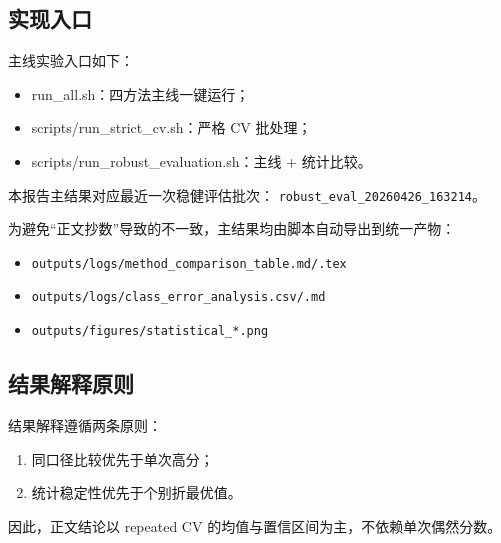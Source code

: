 \subsection{实现入口}

主线实验入口如下：

\begin{itemize}
    \item run\_all.sh：四方法主线一键运行；
    \item scripts/run\_strict\_cv.sh：严格 CV 批处理；
    \item scripts/run\_robust\_evaluation.sh：主线 + 统计比较。
\end{itemize}

本报告主结果对应最近一次稳健评估批次：
\texttt{robust\_eval\_20260426\_163214}。

为避免“正文抄数”导致的不一致，主结果均由脚本自动导出到统一产物：
\begin{itemize}
    \item \texttt{outputs/logs/method\_comparison\_table.md/.tex}
    \item \texttt{outputs/logs/class\_error\_analysis.csv/.md}
    \item \texttt{outputs/figures/statistical\_*.png}
\end{itemize}

\subsection{结果解释原则}

结果解释遵循两条原则：

\begin{enumerate}
    \item 同口径比较优先于单次高分；
    \item 统计稳定性优先于个别折最优值。
\end{enumerate}

因此，正文结论以 repeated CV 的均值与置信区间为主，不依赖单次偶然分数。
